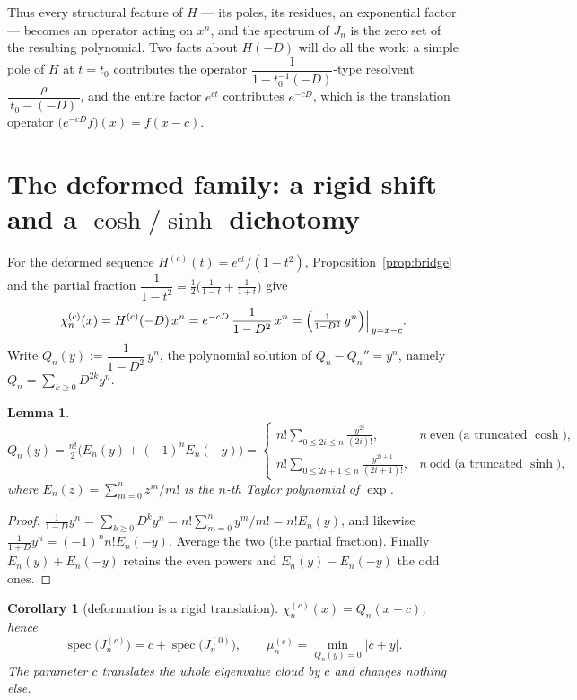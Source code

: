 \documentclass[11pt, fleqn]{amsart}
\newtheorem{lemma}[theorem]{Lemma}
\newtheorem{corollary}[theorem]{Corollary}
\theoremstyle{remark}
\DeclareMathOperator{\spec}{spec}
\begin{document}
Thus every structural feature of $H$ --- its poles, its residues, an exponential factor
--- becomes an operator acting on $x^n$, and the spectrum of $J_n$ is the zero set of the
resulting polynomial. Two facts about $H(-D)$ will do all the work: a simple pole of $H$
at $t=t_0$ contributes the operator $\dfrac{1}{1-t_0^{-1}(-D)}$-type resolvent
$\dfrac{\rho}{\,t_0-(-D)\,}$, and the entire factor $e^{ct}$ contributes $e^{-cD}$, which
is the translation operator $\bigl(e^{-cD}f\bigr)(x)=f(x-c)$.

\section{The deformed family: a rigid shift and a $\cosh/\sinh$ dichotomy}

For the deformed sequence $H^{(c)}(t)=e^{ct}/(1-t^2)$, Proposition~\ref{prop:bridge} and
the partial fraction $\dfrac{1}{1-t^2}=\tfrac12\bigl(\tfrac1{1-t}+\tfrac1{1+t}\bigr)$ give
\[
\chi^{(c)}_n(x)=H^{(c)}(-D)\,x^n
=e^{-cD}\,\frac{1}{1-D^2}\,x^n
=\Bigl(\tfrac{1}{1-D^2}\,y^n\Bigr)\Big|_{\,y=x-c}.
\]
Write $Q_n(y):=\dfrac{1}{1-D^2}\,y^n$, the polynomial solution of $Q_n-Q_n''=y^n$, namely
$Q_n=\sum_{k\ge0}D^{2k}y^n$.

\begin{lemma}\label{lem:Q}
\[
Q_n(y)=\tfrac{n!}{2}\bigl(E_n(y)+(-1)^nE_n(-y)\bigr)
=\begin{cases}
\displaystyle n!\!\!\sum_{0\le 2i\le n}\frac{y^{2i}}{(2i)!}, & n\ \text{even (a truncated }\cosh),\\[1.2em]
\displaystyle n!\!\!\sum_{0\le 2i+1\le n}\frac{y^{2i+1}}{(2i+1)!}, & n\ \text{odd (a truncated }\sinh),
\end{cases}
\]
where $E_n(z)=\sum_{m=0}^n z^m/m!$ is the $n$-th Taylor polynomial of $\exp$.
\end{lemma}

\begin{proof}
$\tfrac1{1-D}y^n=\sum_{k\ge0}D^k y^n=n!\sum_{m=0}^n y^m/m!=n!E_n(y)$, and likewise
$\tfrac1{1+D}y^n=(-1)^n n!E_n(-y)$. Average the two (the partial fraction). Finally
$E_n(y)+E_n(-y)$ retains the even powers and $E_n(y)-E_n(-y)$ the odd ones.
\end{proof}

\begin{corollary}[deformation is a rigid translation]\label{cor:shift}
$\chi^{(c)}_n(x)=Q_n(x-c)$, hence
\[
\spec\bigl(J^{(c)}_n\bigr)=c+\spec\bigl(J^{(0)}_n\bigr),
\qquad
\mu^{(c)}_n=\min_{Q_n(y)=0}|c+y| .
\]
The parameter $c$ translates the whole eigenvalue cloud by $c$ and changes nothing else.
\end{corollary}
\end{document}

